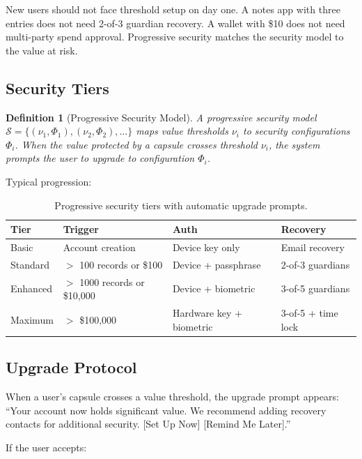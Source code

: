 \documentclass[11pt,a4paper]{article}
\newtheorem{definition}{Definition}
\begin{document}
New users should not face threshold setup on day one. A notes app with three
entries does not need 2-of-3 guardian recovery. A wallet with \$10 does not
need multi-party spend approval. Progressive security matches the security
model to the value at risk.

\subsection{Security Tiers}

\begin{definition}[Progressive Security Model]
A progressive security model $\mathcal{S} = \{(\nu_1, \Phi_1), (\nu_2, \Phi_2), \ldots\}$
maps value thresholds $\nu_i$ to security configurations $\Phi_i$. When the
value protected by a capsule crosses threshold $\nu_i$, the system prompts
the user to upgrade to configuration $\Phi_i$.
\end{definition}

Typical progression:

\begin{table}[H]
\centering
\caption{Progressive security tiers with automatic upgrade prompts.}
\label{tab:progressive}
\begin{tabular}{llll}
\toprule
\textbf{Tier} & \textbf{Trigger} & \textbf{Auth} & \textbf{Recovery} \\
\midrule
Basic & Account creation & Device key only & Email recovery \\
Standard & $>$ 100 records or \$100 & Device + passphrase & 2-of-3 guardians \\
Enhanced & $>$ 1000 records or \$10,000 & Device + biometric & 3-of-5 guardians \\
Maximum & $>$ \$100,000 & Hardware key + biometric & 3-of-5 + time lock \\
\bottomrule
\end{tabular}
\end{table}

\subsection{Upgrade Protocol}

When a user's capsule crosses a value threshold, the upgrade prompt appears:
``Your account now holds significant value. We recommend adding recovery
contacts for additional security. [Set Up Now] [Remind Me Later].''

If the user accepts:
\end{document}
